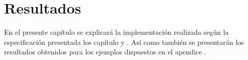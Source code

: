 \chapter{Resultados}\label{chapter:resultados}

En el presente capítulo se explicará la implementación realizada según la 
especificación presentada los capítulo y . Así como
también se presentarán los resultados obtenidos para los ejemplos dispuestos en el apendice 
.

